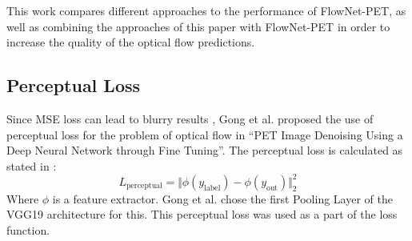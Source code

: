 This work compares different approaches to the performance of FlowNet-PET, as well as combining the approaches of this paper with FlowNet-PET in order to increase the quality of the optical flow predictions.


\subsection{Perceptual Loss}
\label{ss:perceptualloss}
Since MSE loss can lead to blurry results \cite{}, Gong et al. proposed the use of perceptual loss \cite{} for the problem of optical flow in \enquote{PET Image Denoising Using a Deep Neural Network through Fine Tuning}\cite{}.
The perceptual loss is calculated as stated in \cite{}:
$$L_\text{perceptual} = \Vert \phi(y_\text{label}) - \phi (y_\text{out})\Vert^2_2$$
Where $\phi$ is a feature extractor. Gong et al. chose the first Pooling Layer of the VGG19 \cite{} architecture for this.
This perceptual loss was used as a part of the loss function.

